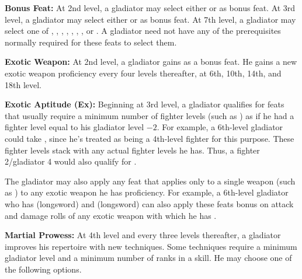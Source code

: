 \textbf{Bonus Feat:} At 2nd level, a gladiator may select either  or  as bonus feat. At 3rd level, a gladiator may select either  or  as bonus feat. At 7th level, a gladiator may select one of , , , , , , , or . A gladiator need not have any of the prerequisites normally required for these feats to select them.

\textbf{Exotic Weapon:} At 2nd level, a gladiator gains  as a bonus feat. He gains a new exotic weapon proficiency every four levels thereafter, at 6th, 10th, 14th, and 18th level.

\textbf{Exotic Aptitude (Ex):} Beginning at 3rd level, a gladiator qualifies for feats that usually require a minimum number of fighter levels (such as ) as if he had a fighter level equal to his gladiator level $-2$. For example, a 6th-level gladiator could take , since he's treated as being a 4th-level fighter for this purpose. These fighter levels stack with any actual fighter levels he has. Thus, a fighter 2/gladiator 4 would also qualify for .

The gladiator may also apply any feat that applies only to a single weapon (such as ) to any exotic weapon he has proficiency. For example, a 6th-level gladiator who has  (longsword) and  (longsword) can also apply these feats bonus on attack and damage rolls of any exotic weapon with which he has .

\textbf{Martial Prowess:} At 4th level and every three levels thereafter, a gladiator improves his repertoire with new techniques. Some techniques require a minimum gladiator level and a minimum number of ranks in a skill. He may choose one of the following options.

 

